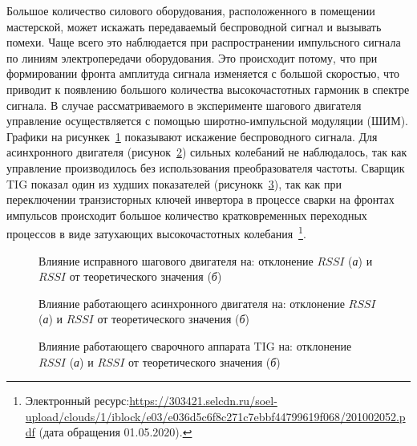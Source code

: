 Большое количество силового оборудования, расположенного в помещении мастерской, может искажать передаваемый беспроводной сигнал и вызывать помехи. Чаще всего это наблюдается при распространении импульсного сигнала по линиям электропередачи оборудования. Это происходит потому, что при формировании фронта амплитуда сигнала изменяется с большой скоростью, что приводит к появлению большого количества высокочастотных гармоник в спектре сигнала. В случае рассматриваемого в эксперименте шагового двигателя управление осуществляется с помощью широтно-импульсной модуляции (ШИМ). Графики на рисункек~\cref{ch-3/fig-8} показывают искажение беспроводного сигнала. Для асинхронного двигателя (рисунок~\cref{ch-3/fig-9}) сильных колебаний не наблюдалось, так как управление производилось без использования преобразователя частоты. Сварщик TIG показал один из худших показателей (рисунокк~\cref{ch-3/fig-10}), так как при переключении транзисторных ключей инвертора в процессе сварки на фронтах импульсов происходит большое количество кратковременных переходных процессов в виде затухающих высокочастотных колебания~\footnote{Электронный ресурс:{\tiny\url{https://303421.selcdn.ru/soel-upload/clouds/1/iblock/e03/e036d5c6f8c271c7ebbf44799619f068/201002052.pdf}} (дата обращения 01.05.2020).}.

\begin{figure} [htb]
	\caption{Влияние исправного шагового двигателя на: отклонение $RSSI$ (\textit{а}) и $RSSI$ от теоретического значения (\textit{б})}
	\label{ch-3/fig-8}
\end{figure}

\begin{figure} [htb]
	\caption{Влияние работающего асинхронного двигателя на: отклонение $RSSI$ (\textit{а}) и $RSSI$ от теоретического значения (\textit{б})}
	\label{ch-3/fig-9}
\end{figure}

\begin{figure} [htb]
	\caption{Влияние работающего сварочного аппарата TIG на: отклонение $RSSI$ (\textit{а}) и $RSSI$ от теоретического значения (\textit{б})}
	\label{ch-3/fig-10}
\end{figure}

